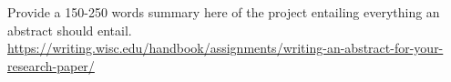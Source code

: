 Provide a 150-250 words summary here of the project entailing everything an abstract should entail. \\
\url{https://writing.wisc.edu/handbook/assignments/writing-an-abstract-for-your-research-paper/}
